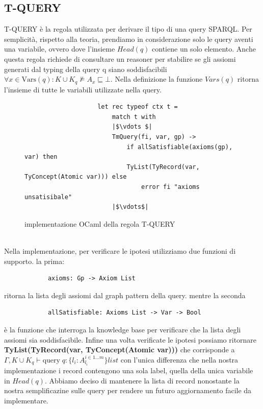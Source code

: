             \subsection{T-QUERY}
            T-QUERY è la regola utilizzata per derivare il tipo di una query SPARQL. Per semplicità, rispetto alla teoria, prendiamo in considerazione solo le query
            aventi una variabile, ovvero dove l'insieme $Head(q)$ contiene un solo elemento. Anche questa regola richiede di consultare un reasoner per stabilire se
            gli assiomi generati dal typing della query q siano soddisfacibili $\forall x \in \textrm{Vars}(q) : K \cup K_q \nvDash A_x \sqsubseteq \bot$.
            Nella definizione la funzione $Vars(q)$ ritorna l'insieme di tutte le variabili utilizzate nella query.
            \begin{figure}[h]
                \begin{verbatim}
                    let rec typeof ctx t =
                        match t with
                        |$\vdots $|
                        TmQuery(fi, var, gp) ->
                            if allSatisfiable(axioms(gp), var) then
                            TyList(TyRecord(var, TyConcept(Atomic var))) else
                                error fi "axioms unsatisibale"
                        |$\vdots$|
                \end{verbatim}
            \caption{implementazione OCaml della regola T-QUERY}
            \end{figure}
            \\Nella implementazione, per verificare le ipotesi utilizziamo due funzioni di supporto. la prima:
            \begin{verbatim}
            axioms: Gp -> Axiom List
            \end{verbatim}
            ritorna la lista degli assiomi dal graph pattern della query. mentre la seconda
            \begin{verbatim}
            allSatisfiable: Axioms List -> Var -> Bool
            \end{verbatim}
            è la funzione che interroga la knowledge base per verificare che la lista degli assiomi sia soddisfacibile. Infine una volta verificate le ipotesi possiamo
            ritornare
            \\\textbf{TyList(TyRecord(var, TyConcept(Atomic \; var)))} che corrisponde a $\Gamma,K \cup K_q \vdash \textrm{query} \; q : \{l_i : A_{l_i}^{i \in 1...m}\} list$
            con l'unica differenza che nella nostra implementazione i record contengono una sola label, quella della unica variabile in $Head(q)$. Abbiamo deciso di
            mantenere la lista di record nonostante la nostra semplificazine sulle query per rendere un futuro aggiornamento facile da implementare.
